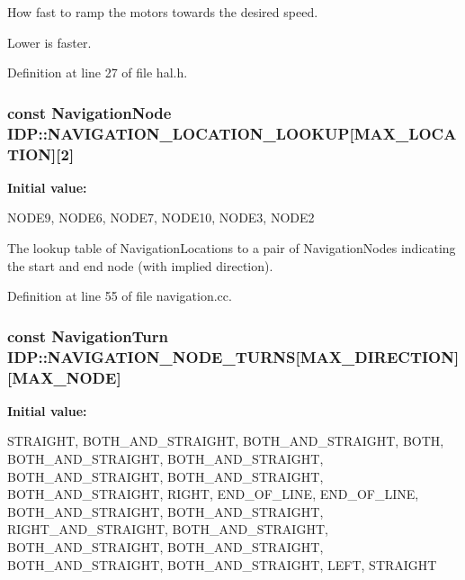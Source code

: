 How fast to ramp the motors towards the desired speed. 

Lower is faster. 

Definition at line 27 of file hal.h.

\hypertarget{namespaceIDP_a33e1b72d66088b211bfeb61b18d7b63b}{
\subsubsection[{NAVIGATION\_\-LOCATION\_\-LOOKUP}]{\setlength{\rightskip}{0pt plus 5cm}const {\bf NavigationNode} {\bf IDP::NAVIGATION\_\-LOCATION\_\-LOOKUP}\mbox{[}MAX\_\-LOCATION\mbox{]}\mbox{[}2\mbox{]}}}
\label{namespaceIDP_a33e1b72d66088b211bfeb61b18d7b63b}
{\bfseries Initial value:}
\begin{DoxyCode}
 {
        {NODE9, NODE6}, 
        {NODE7, NODE10},
        {NODE3, NODE2}  
    }
\end{DoxyCode}


The lookup table of NavigationLocations to a pair of NavigationNodes indicating the start and end node (with implied direction). 



Definition at line 55 of file navigation.cc.

\hypertarget{namespaceIDP_aa117cb76acf18e6af22830d5f2468ff4}{
\subsubsection[{NAVIGATION\_\-NODE\_\-TURNS}]{\setlength{\rightskip}{0pt plus 5cm}const {\bf NavigationTurn} {\bf IDP::NAVIGATION\_\-NODE\_\-TURNS}\mbox{[}MAX\_\-DIRECTION\mbox{]}\mbox{[}MAX\_\-NODE\mbox{]}}}
\label{namespaceIDP_aa117cb76acf18e6af22830d5f2468ff4}
{\bfseries Initial value:}
\begin{DoxyCode}
 {
        {STRAIGHT, BOTH_AND_STRAIGHT, BOTH_AND_STRAIGHT, BOTH,
            BOTH_AND_STRAIGHT, BOTH_AND_STRAIGHT, BOTH_AND_STRAIGHT,
            BOTH_AND_STRAIGHT, BOTH_AND_STRAIGHT, RIGHT, END_OF_LINE},
        {END_OF_LINE, BOTH_AND_STRAIGHT, BOTH_AND_STRAIGHT, RIGHT_AND_STRAIGHT,
            BOTH_AND_STRAIGHT, BOTH_AND_STRAIGHT, BOTH_AND_STRAIGHT,
            BOTH_AND_STRAIGHT, BOTH_AND_STRAIGHT, LEFT, STRAIGHT}
    }
\end{DoxyCode}


